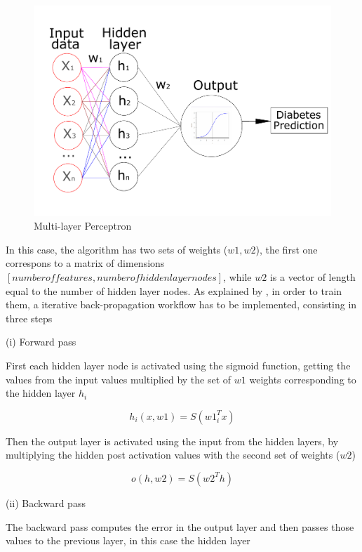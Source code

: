 \documentclass[10pt,twocolumn,letterpaper]{article}
\begin{document}
\begin{figure}[h]
	\begin{center}
		\includegraphics[width=1.0\linewidth]{Figura.pdf}
	\end{center}
	\caption{Multi-layer Perceptron}
	\label{fig:mlp}
\end{figure}


In this case, the algorithm has two sets of weights ($w1, w2$), the first one correspons to a matrix of dimensions $[number of features, number of hidden layer nodes]$, while $w2$ is a vector of length equal to the number of hidden layer nodes. As explained by \cite{Vapnik1995}, in order to train them, a iterative back-propagation workflow has to be implemented, consisting in three steps

(i) Forward pass

First each hidden layer node is activated using the sigmoid function, getting the values from the input values multiplied by the set of $w1$ weights corresponding to the hidden layer $h_i$

\begin{equation}
h_i(x,w1) = S(w1_i^T x)
\end{equation}

Then the output layer is activated using the input from the hidden layers, by multiplying the hidden post activation values with the second set of weights ($w2$)

\begin{equation}
o(h,w2) = S(w2^T h)
\end{equation}

(ii) Backward pass

The backward pass computes the error in the output layer and then passes those values to the previous layer, in this case the hidden layer
\end{document}
